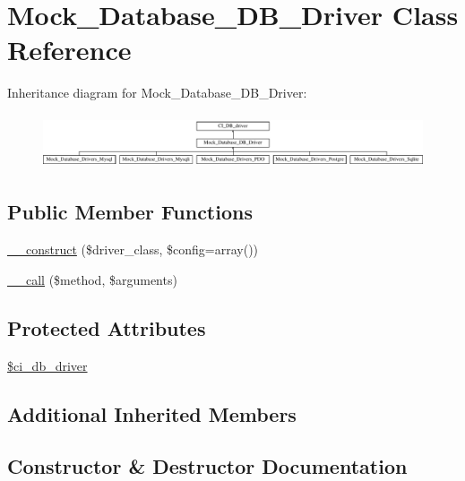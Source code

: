 \hypertarget{class_mock___database___d_b___driver}{}\section{Mock\+\_\+\+Database\+\_\+\+D\+B\+\_\+\+Driver Class Reference}
\label{class_mock___database___d_b___driver}
Inheritance diagram for Mock\+\_\+\+Database\+\_\+\+D\+B\+\_\+\+Driver\+:\begin{figure}[H]
\begin{center}
\leavevmode
\includegraphics[height=1.600000cm]{class_mock___database___d_b___driver}
\end{center}
\end{figure}
\subsection*{Public Member Functions}
\begin{DoxyCompactItemize}
\item 
\hyperlink{class_mock___database___d_b___driver_a4beddb706714b43eaeac49b8fea9604c}{\+\_\+\+\_\+construct} (\$driver\+\_\+class, \$config=array())
\item 
\hyperlink{class_mock___database___d_b___driver_acfa40ec504c3c792c3b84cf2f1af511d}{\+\_\+\+\_\+call} (\$method, \$arguments)
\end{DoxyCompactItemize}
\subsection*{Protected Attributes}
\begin{DoxyCompactItemize}
\item 
\hyperlink{class_mock___database___d_b___driver_aebf487ba6f39ae3b9bf272a78ae3f069}{\$ci\+\_\+db\+\_\+driver}
\end{DoxyCompactItemize}
\subsection*{Additional Inherited Members}


\subsection{Constructor \& Destructor Documentation}
\hypertarget{class_mock___database___d_b___driver_a4beddb706714b43eaeac49b8fea9604c}{}
